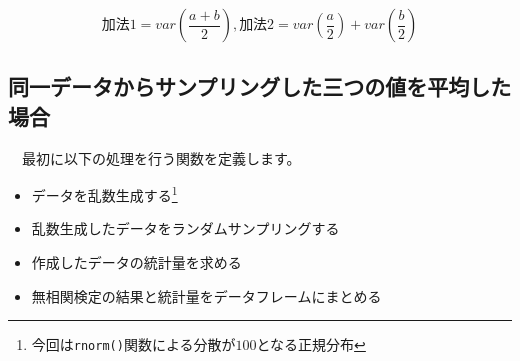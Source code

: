 \documentclass[a4paper]{tufte-handout}
\providecommand{\tightlist}{%
  \setlength{\itemsep}{0pt}\setlength{\parskip}{0pt}}
\begin{document}
\[\mbox{加法1} = var(\frac{a + b}{2}),　\mbox{加法2} = var(\frac{a}{2}) + var(\frac{b}{2})\]

\newpage

\hypertarget{ux540cux4e00ux30c7ux30fcux30bfux304bux3089ux30b5ux30f3ux30d7ux30eaux30f3ux30b0ux3057ux305fux4e09ux3064ux306eux5024ux3092ux5e73ux5747ux3057ux305fux5834ux5408}{%
\subsection{\texorpdfstring{\textbf{同一データからサンプリングした三つの値を平均した場合}}{同一データからサンプリングした三つの値を平均した場合}}\label{ux540cux4e00ux30c7ux30fcux30bfux304bux3089ux30b5ux30f3ux30d7ux30eaux30f3ux30b0ux3057ux305fux4e09ux3064ux306eux5024ux3092ux5e73ux5747ux3057ux305fux5834ux5408}}

　最初に以下の処理を行う関数を定義します。

\begin{itemize}
\tightlist
\item
  データを乱数生成する\footnote{今回は\texttt{rnorm()}関数による分散が\(100\)となる正規分布}
\item
  乱数生成したデータをランダムサンプリングする
\item
  作成したデータの統計量を求める
\item
  無相関検定の結果と統計量をデータフレームにまとめる
\end{itemize}
\end{document}
